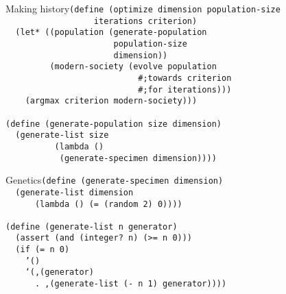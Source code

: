 \documentclass{beamer}
\begin{document}
\begin{frame}{Making history}\texttt{(define (optimize dimension population-size\\
\ \ \ \ \ \ \ \ \ \ \ \ \ \ \ \ \ \ iterations criterion)\\ \pause
\ \ (let* ((population (generate-population \\
\ \ \ \ \ \ \ \ \ \ \ \ \ \ \ \ \ \ \ \ \ \ population-size \\
\ \ \ \ \ \ \ \ \ \ \ \ \ \ \ \ \ \ \ \ \ \ dimension))\\ \pause
\ \ \ \ \ \ \ \ \ (modern-society (evolve population \\
\ \ \ \ \ \ \ \ \ \ \ \ \ \ \ \ \ \ \ \ \ \ \ \ \ \ \
\#;towards criterion \\
\ \ \ \ \ \ \ \ \ \ \ \ \ \ \ \ \ \ \ \ \ \ \ \ \ \ \
\#;for iterations))) \\ \pause
\ \ \ \ (argmax criterion modern-society)))\\ \pause
\ \\
(define (generate-population size dimension)\\ \pause
\ \ (generate-list size \\
\ \ \ \ \ \ \ \ \ \ (lambda ()\\
\ \ \ \ \ \ \ \ \ \ \ (generate-specimen dimension))))
}
\end{frame}


\begin{frame}{Genetics}\texttt{(define (generate-specimen dimension)\\ \pause
\ \ (generate-list dimension \\
\ \ \ \ \ \  (lambda () (= (random 2) 0))))\\ \pause
\ \\
(define (generate-list n generator)\\ \pause
\ \ (assert (and (integer? n) (>= n 0)))\\ \pause
\ \ (if (= n 0)\\
\ \ \ \ '()\\ \pause
\ \ \ \ `(,(generator)\\
\ \ \ \ \ \ . ,(generate-list (- n 1) generator))))
}
\end{frame}
\end{document}
